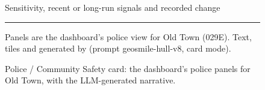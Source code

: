 \begin{figure}[!htbp]
\begin{tcolorbox}[enhanced, colback=white, colframe=cardRule, arc=3mm, boxrule=0.6pt,
                  left=3mm, right=3mm, top=2.5mm, bottom=2.5mm, before skip=0pt, after skip=2pt,
                  fontupper=\sffamily\normalsize\color{cardInk}]
\setlength{\parskip}{0pt}\raggedright%
\par\smallskip
{\color{cardMuted}Sensitivity, recent or long-run signals and recorded change}\par\vspace{4pt}
\begin{minipage}[t]{0.46\linewidth}\vspace{0pt}
\end{minipage}\hfill
\begin{minipage}[t]{0.51\linewidth}\vspace{14pt}\raggedright
  \cardSecA\par
\end{minipage}\par\vspace{5pt}
\begin{minipage}[t]{0.46\linewidth}\vspace{0pt}
\end{minipage}\hfill
\begin{minipage}[t]{0.51\linewidth}\vspace{14pt}\raggedright
  \cardSecB\par
\end{minipage}\par\vspace{4pt}
\par\vspace{2pt}
\noindent\cardTileA\hfill\cardTileB\hfill\cardTileC\hfill\cardTileD\par\vspace{4pt}
{\color{cardRule}\rule{\linewidth}{0.4pt}}\par\vspace{1pt}
{\color{cardMuted}\footnotesize \cardFooter{} Panels are the dashboard's police view for Old Town
(029E). Text, tiles and  generated by \cardModel{} (prompt geosmile-hull-v8, card
mode).\par}
\end{tcolorbox}
\caption{Police / Community Safety card: the dashboard's police panels for Old Town, with the
LLM-generated narrative.}
\label{fig:stakeholder-police}
\end{figure}

